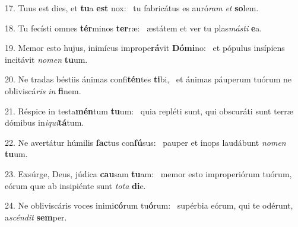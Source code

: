 17. Tuus est dies, et \textbf{tu}a \textbf{est} nox: \ast\  tu fabricátus es auró\textit{ram} \textit{et} \textbf{so}lem.\

18. Tu fecísti omnes \textbf{tér}minos \textbf{ter}ræ: \ast\  æstátem et ver tu plas\textit{más}\textit{ti} \textbf{e}a.\

19. Memor esto hujus, inimícus imprope\textbf{rá}vit \textbf{Dó}\textbf{mi}no: \ast\  et pópulus insípiens incitávit \textit{no}\textit{men} \textbf{tu}um.\

20. Ne tradas béstiis ánimas confi\textbf{tén}tes \textbf{ti}bi, \ast\  et ánimas páuperum tuórum ne obliviscá\textit{ris} \textit{in} \textbf{fi}nem.\

21. Réspice in testa\textbf{mén}tum \textbf{tu}um: \ast\  quia repléti sunt, qui obscuráti sunt terræ dómibus in\textit{i}\textit{qui}\textbf{tá}tum.\

22. Ne avertátur húmilis \textbf{fac}tus con\textbf{fú}sus: \ast\  pauper et inops laudábunt \textit{no}\textit{men} \textbf{tu}um.\

23. Exsúrge, Deus, júdica \textbf{cau}sam \textbf{tu}am: \ast\  memor esto improperiórum tuórum, eórum quæ ab insipiénte sunt \textit{to}\textit{ta} \textbf{di}e.\

24. Ne obliviscáris voces inimi\textbf{có}rum tu\textbf{ó}rum: \ast\  supérbia eórum, qui te odérunt, a\textit{scén}\textit{dit} \textbf{sem}per.\

